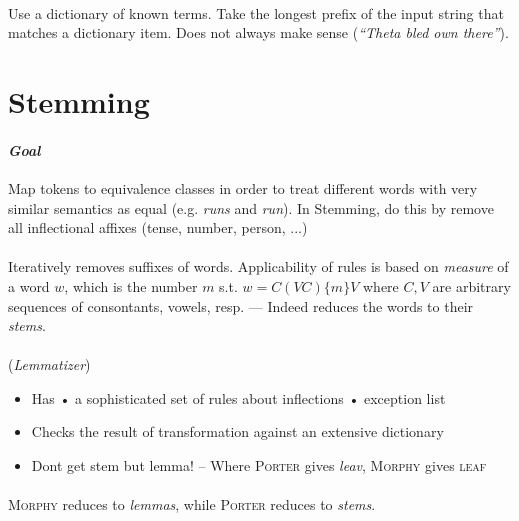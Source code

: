 \documentclass[10pt,twocolumn]{article}
\begin{document}
\paragraph{} Use a dictionary of known terms.
Take the longest prefix of the input string that matches a dictionary item. Does
not always make sense (\textit{``Theta bled own there''}).

\section{Stemming}

\paragraph{\textit{Goal}} Map tokens to equivalence classes in order to treat
different words with very similar semantics as equal (e.g. \textit{runs} and
\textit{run}). In Stemming, do this by remove all inflectional affixes (tense,
number, person, ...)

\paragraph{ } Iteratively removes suffixes of words.
Applicability of rules is based on \textit{measure} of a word $w$, which is the
number $m$ s.t. $w=C(VC)\{m\}V$ where $C,V$ are arbitrary sequences of
consontants, vowels, resp. --- Indeed reduces the words to their \textit{stems}.

\paragraph{ } (\textit{Lemmatizer})
\begin{itemize}
\item Has  •  a sophisticated set of rules about inflections  • exception list
\item Checks the result of transformation against an extensive dictionary
\item Dont get stem but lemma! -- Where \textsc{Porter} gives \textit{leav},
  \textsc{Morphy} gives \textsc{leaf}
\end{itemize}

\paragraph{} \textsc{Morphy} reduces to \textit{lemmas}, while
\textsc{Porter} reduces to \textit{stems}.
\end{document}
